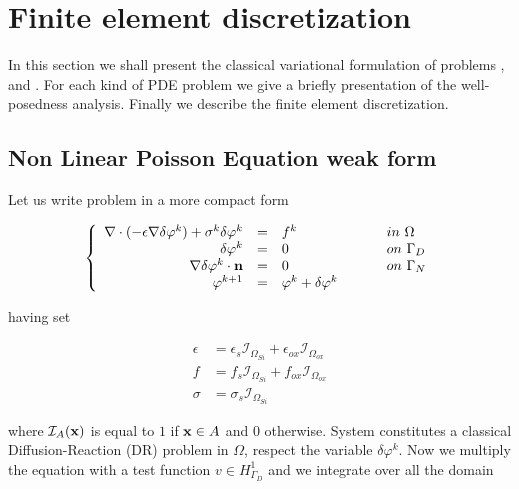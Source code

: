 \chapter{Finite element discretization}

In this section we shall present the classical variational formulation of problems ,  and . For each kind of PDE problem we give a briefly presentation of the well-posedness analysis. Finally we describe the finite element discretization. 


\section{Non Linear Poisson Equation weak form}

Let us write problem  in a more compact form

\begin{equation}
\label{sys: NLP general problem linearized}
\left\{
\begin{array}{rcll}
\nabla \cdot (-\epsilon \nabla \delta \varphi^k) + \sigma^k \delta \varphi^k & = &  f^k & \psp{15} in \psp{2} \Omega \\
\delta \varphi^k & = & 0 & \psp{15} on \psp{2} \Gamma_D \\
\nabla \delta \varphi ^k\cdot \vect{n} & = & 0 & \psp{15} on \psp{2} \Gamma_N
\\
\varphi^{k+1} & = & \varphi^k + \delta \varphi^k
\end{array}
\right.
\end{equation}

having set

\begin{align*}
\epsilon & = \epsilon_s \mathcal{I}_{\Omega_{Si}} + \epsilon_{ox} \mathcal{I}_{\Omega_{ox}} \\
f & = f_s \mathcal{I}_{\Omega_{Si}} + f_{ox} \mathcal{I}_{\Omega_{ox}} \\
\sigma & = \sigma_s \mathcal{I}_{\Omega_{Si}}
\end{align*}

where $\mathcal{I}_A(\mathbf{x})$ is equal to $1$ if $\mathbf{x}\in A$ and $0$ otherwise.
System  constitutes a classical Diffusion-Reaction (DR) problem in $\Omega$, respect the variable $\delta \varphi^k$. 
Now we multiply the equation with a test function $v \in H^1_{\Gamma_D}$ and we integrate over all the domain

